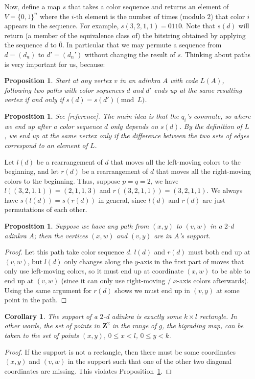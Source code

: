 \documentclass[12pt,twoside,singlespace]{article}
\numberwithin{equation}{section}
\newtheorem{cor}[equation]{Corollary}
\newtheorem{prop}[equation]{Proposition}
\theoremstyle{definition}
\newcommand{\ZZ}{\mathbf{Z}}
\begin{document}
Now, define a map $s$ that takes a color sequence and returns an element of $V = \{0,1\}^n$ where the $i$-th element is the number of times (modulo $2$) that color $i$ appears in the sequence. For example, $s(3,2,1,1) = 0110$. Note that $s(d)$ will return (a member of the equivalence class of) the bitstring obtained by applying the sequence $d$ to $\overline{0}$.  In particular that we may permute a sequence from $d = (d_n)$ to $d' = (d_n')$ without changing the result of $s$. Thinking about paths is very important for us, because:

\begin{prop}
\label{prop:paths}
Start at any vertex $v$ in an adinkra $A$ with code $L(A)$, following two paths with color sequences $d$ and $d'$ ends up at the same resulting vertex if and only if $s(d) = s(d') \pmod{L}$.
\end{prop}
\begin{prop}
See [reference]. The main idea is that the $q_i$'s commute, so where we end up after a color sequence $d$ only depends on $s(d)$. By the definition of $L$, we end up at the same vertex only if the difference between the two sets of edges correspond to an element of $L$.
\end{prop}

Let $l(d)$ be a rearrangement of $d$ that moves all the left-moving colors to the beginning, and let $r(d)$ be a rearrangement of $d$ that moves all the right-moving colors to the beginning. Thus, suppose $p = q = 2$, we have $l((3,2,1,1)) = (2,1,1,3)$ and $r((3,2,1,1)) = (3,2,1,1)$. We always have $s(l(d)) = s(r(d))$ in general, since $l(d)$ and $r(d)$ are just permutations of each other.

\begin{prop}
\label{prop:rectangle-completion}
Suppose we have any path from $(x,y)$ to $(v,w)$ in a $2$-d adinkra $A$; then the vertices $(x,w)$ and $(v,y)$ are in $A$'s support.
\end{prop}
\begin{proof}
Let this path take color sequence $d$. $l(d)$ and $r(d)$ must both end up at $(v,w)$, but $l(d)$ only changes along the $y$-axis in the first part of moves that only use left-moving colors, so it must end up at coordinate $(x,w)$ to be able to end up at $(v,w)$ (since it can only use right-moving / $x$-axis colors afterwards). Using the same argument for $r(d)$ shows we must end up in $(v,y)$ at some point in the path.
\end{proof}

\begin{cor}
\label{cor:rectangle}
The support of a $2$-d adinkra is exactly some $k \times l$ rectangle. In other words, the set of points in $\ZZ^2$ in the range of $g$, the bigrading map, can be taken to the set of points $(x,y)$, $0 \leq x < l$, $0 \leq y < k$.
\end{cor}
\begin{proof}
If the support is not a rectangle, then there must be some coordinates $(x,y)$ and $(v,w)$ in the support such that one of the other two diagonal coordinates are missing. This violates Proposition~\ref{prop:rectangle-completion}.
\end{proof}
\end{document}
